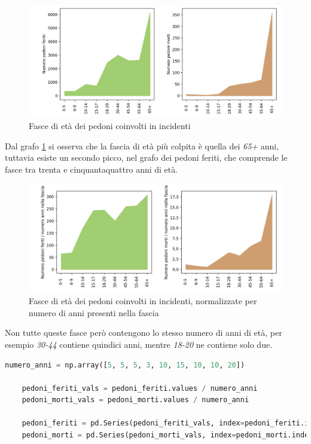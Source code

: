 \documentclass[a4paper]{report}
\begin{document}
\begin{figure}
    \includegraphics[width=\linewidth]{../src/incidenti/incidenti_senza_coords/pedoni/eta_pedoni_iniziale.png}
    \caption{Fasce di età dei pedoni coinvolti in incidenti}
    \label{fig:eta-pedoni-iniziale}
\end{figure}

Dal grafo \ref{fig:eta-pedoni-iniziale} si osserva che la fascia di età più colpita 
è quella dei \textit{65+} anni, tuttavia esiste un secondo picco, nel grafo dei pedoni feriti, 
che  comprende le fasce tra trenta e cinquantaquattro anni di età.

\begin{figure}
    \includegraphics[width=\linewidth]{../src/incidenti/incidenti_senza_coords/pedoni/eta_pedoni.png}
    \caption{Fasce di età dei pedoni coinvolti in incidenti, normalizzate per numero di anni 
    presenti nella fascia}
    \label{fig:eta-pedoni}
\end{figure}

Non tutte queste fasce però contengono lo stesso numero di anni di età, per esempio 
\textit{30-44} contiene quindici anni, mentre \textit{18-20} ne contiene solo due.

\begin{lstlisting}[language=Python]
    numero_anni = np.array([5, 5, 5, 3, 10, 15, 10, 10, 20])

    pedoni_feriti_vals = pedoni_feriti.values / numero_anni
    pedoni_morti_vals = pedoni_morti.values / numero_anni

    pedoni_feriti = pd.Series(pedoni_feriti_vals, index=pedoni_feriti.index)
    pedoni_morti = pd.Series(pedoni_morti_vals, index=pedoni_morti.index)
\end{lstlisting}
\end{document}
